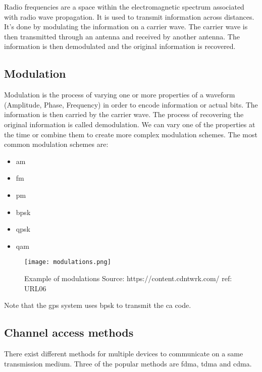 
Radio frequencies are a space within the electromagnetic spectrum associated with radio wave propagation. It is used to transmit information across distances. It's done by modulating the information on a carrier wave. The carrier wave is then transmitted through an antenna and received by another antenna. The information is then demodulated and the original information is recovered.

\subsection{Modulation}

Modulation is the process of varying one or more properties of a waveform (Amplitude, Phase, Frequency) in order to encode information or actual bits. The information is then carried by the carrier wave. The process of recovering the original information is called demodulation. We can vary one of the properties at the time or combine them to create more complex modulation schemes. The most common modulation schemes are:

\begin{itemize}
	\item \gls{am}
	\item \gls{fm}
	\item \gls{pm}
	\item \gls{bpsk}
	\item \gls{qpsk}
	\item \gls{qam}
\end{itemize}


\begin{figure}[H]
	\centering
	\texttt{[image: modulations.png]}
	\caption[Modulations]{Example of modulations Source: https://content.cdntwrk.com/ ref: URL06}
	\label{fig:modulations}
\end{figure}

Note that the \gls{gps} system uses \gls{bpsk} to transmit the \gls{ca} code.


\subsection{Channel access methods}

There exist different methods for multiple devices to communicate on a same transmission medium. Three of the popular methods are \gls{fdma}, \gls{tdma} and \gls{cdma}.

